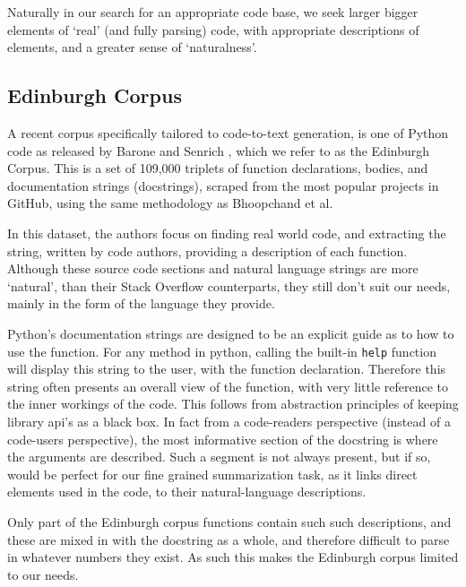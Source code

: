 Naturally in our search for an appropriate code base, we seek larger bigger elements of `real' (and fully parsing) code, with appropriate descriptions of elements, and a greater sense of `naturalness'.

\subsection{Edinburgh Corpus}

A recent corpus specifically tailored to code-to-text generation, is one of Python code as released by Barone and Senrich \cite{barone_parallel_2017}, which we refer to as the Edinburgh Corpus. 
This is a set of 109,000 triplets of function declarations, bodies, and documentation strings (docstrings), scraped from the most popular projects in GitHub, using the same methodology as Bhoopchand et al. 

In this dataset, the authors focus on finding real world code, and extracting the string, written by code authors, providing a description of each function.
Although these source code sections and natural language strings are more `natural', than their Stack Overflow counterparts, they still don't suit our needs, mainly in the form of the language they provide. 

Python's documentation strings are designed to be an explicit guide as to how to use the function. 
For any method in python, calling the built-in \texttt{help} function will display this string to the user, with the function declaration. 
Therefore this string often presents an overall view of the function, with very little reference to the inner workings of the code. 
This follows from abstraction principles of keeping library api's as a black box.
In fact from a code-readers perspective (instead of a code-users perspective), the most informative section of the docstring is where the arguments are described. 
Such a segment is not always present, but if so, would be perfect for our fine grained summarization task, as it links direct elements used in the code, to their natural-language descriptions. 

Only part of the Edinburgh corpus functions contain such such descriptions, and these are mixed in with the docstring as a whole, and therefore difficult to parse in whatever numbers they exist.
As such this makes the Edinburgh corpus limited to our needs.



